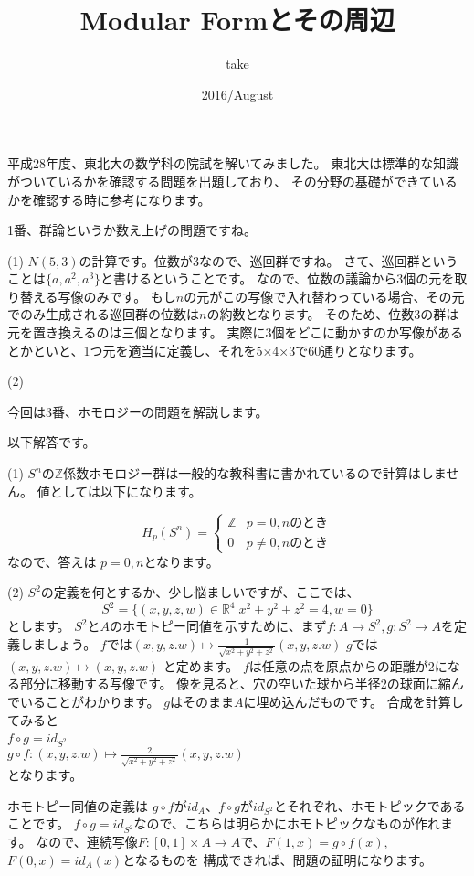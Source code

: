 \documentclass{ujarticle}
\title{Modular Formとその周辺}
\author{take}
\date{2016/August}
\begin{document}
平成28年度、東北大の数学科の院試を解いてみました。
東北大は標準的な知識がついているかを確認する問題を出題しており、
その分野の基礎ができているかを確認する時に参考になります。

1番、群論というか数え上げの問題ですね。

(1)
$N(5,3)$の計算です。位数が3なので、巡回群ですね。
さて、巡回群ということは$\{ a, a^2 , a^3 \}$と書けるということです。
なので、位数の議論から3個の元を取り替える写像のみです。
もし$n$の元がこの写像で入れ替わっている場合、その元でのみ生成される巡回群の位数は$n$の約数となります。
そのため、位数3の群は元を置き換えるのは三個となります。
実際に3個をどこに動かすのか写像があるとかといと、1つ元を適当に定義し、それを5×4×3で60通りとなります。


(2)

今回は3番、ホモロジーの問題を解説します。

以下解答です。

(1)
$S^n$の$\mathbb{Z}$係数ホモロジー群は一般的な教科書に書かれているので計算はしません。
値としては以下になります。

\begin{equation*}
  H_p(S^n ) =
  \begin{cases}
    \mathbb{Z} & \text{$p =0,n$のとき}　\\
    0  & \text{$p  \neq 0,n$のとき}
  \end{cases}
\end{equation*}
なので、答えは
$p =0,n$となります。

(2)
$S^2$の定義を何とするか、少し悩ましいですが、ここでは、
\begin{equation*}
  S^2 = \{ (x,y,z,w) \in \mathbb{R}^4 |  x^2 + y^2 + z^2 = 4 ,w =0 \}
\end{equation*}
とします。
$S^2$と$A$のホモトピー同値を示すために、まず$f:A \to S^2,g:S^2 \to A$を定義しましょう。
$f$では$(x,y,z.w) \mapsto  \frac{1}{\sqrt{x^2 + y^2 + z^2}}(x,y,z.w)$
$g$では$(x,y,z.w) \mapsto  (x,y,z.w)$
と定めます。
$f$は任意の点を原点からの距離が2になる部分に移動する写像です。
像を見ると、穴の空いた球から半径2の球面に縮んでいることがわかります。
$g$はそのまま$A$に埋め込んだものです。
合成を計算してみると　\\
$f \circ g = id_{S^2}$　 \\
$g \circ f :(x,y,z.w) \mapsto \frac{2}{\sqrt{x^2 + y^2 + z^2}}(x,y,z.w) $ \\
となります。

ホモトピー同値の定義は
$g \circ f$が$id_A$、$f \circ  g$が$id_{S^2}$とそれぞれ、ホモトピックであることです。
$f \circ g = id_{S^2}$なので、こちらは明らかにホモトピックなものが作れます。
なので、連続写像$F:[0,1] \times A \to A$で、$F(1,x)=g \circ f (x)$,$F(0,x) = id_A(x)$となるものを
構成できれば、問題の証明になります。
\end{document}
